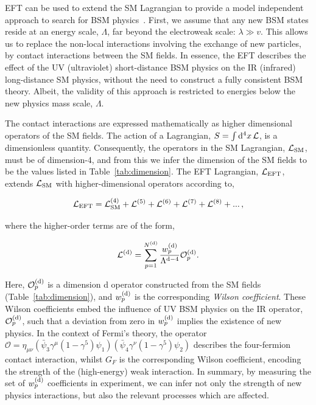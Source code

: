 EFT can be used to extend the SM Lagrangian to provide a model independent approach to search for BSM physics~\cite{Brivio:2017vri}. First, we assume that any new BSM states reside at an energy scale, $\Lambda$, far beyond the electroweak scale: $\lambda \gg v$. This allows us to replace the non-local interactions involving the exchange of new particles, by contact interactions between the SM fields. In essence, the EFT describes the effect of the UV (ultraviolet) short-distance BSM physics on the IR (infrared) long-distance SM physics, without the need to construct a fully consistent BSM theory. Albeit, the validity of this approach is restricted to energies below the new physics mass scale, $\Lambda$.

The contact interactions are expressed mathematically as higher dimensional operators of the SM fields. The action of a Lagrangian, $S=\int {\rm{d}}^4x\,\mathcal{L}$, is a dimensionless quantity. Consequently, the operators in the SM Lagrangian, $\mathcal{L}_{\rm{SM}}$, must be of dimension-4, and from this we infer the dimension of the SM fields to be the values listed in Table~\ref{tab:dimension}. The EFT Lagrangian, $\mathcal{L}_{\rm{EFT}}$, extends $\mathcal{L}_{\rm{SM}}$ with higher-dimensional operators according to,

\begin{equation}\label{eq:eft_expansion}
    \mathcal{L}_{\rm{EFT}} = \mathcal{L}^{\rm{(4)}}_{\rm{SM}} + \mathcal{L}^{\rm{(5)}} + \mathcal{L}^{\rm{(6)}} + \mathcal{L}^{\rm{(7)}} + \mathcal{L}^{\rm{(8)}} + {\rm{...}} \, ,
\end{equation}

\noindent
where the higher-order terms are of the form,

\begin{equation}\label{eq:eft_term}
    \mathcal{L}^{\rm{(d)}} = \sum^{N^{\rm{(d)}}}_{p=1} \frac{w^{\rm{(d)}}_p}{\Lambda^{{\rm{d}}-4}} \mathcal{O}^{\rm{(d)}}_p.
\end{equation}

\noindent
Here, $\mathcal{O}^{\rm{(d)}}_p$ is a dimension d operator constructed from the SM fields (Table~\ref{tab:dimension}), and $w^{\rm{(d)}}_p$ is the corresponding \textit{Wilson coefficient}. These Wilson coefficients embed the influence of UV BSM physics on the IR operator, $\mathcal{O}^{\rm{(d)}}_p$, such that a deviation from zero in $w^{\rm{(d)}}_p$ implies the existence of new physics. In the context of Fermi's theory, the operator $\mathcal{O}=\eta_{\mu\nu} (\bar{\psi}_3 \gamma^\mu(1-\gamma^5) \psi_1)(\bar{\psi}_4 \gamma^\nu(1-\gamma^5) \psi_2)$ describes the four-fermion contact interaction, whilst $G_F$ is the corresponding Wilson coefficient, encoding the strength of the (high-energy) weak interaction. In summary, by measuring the set of $w^{\rm{(d)}}_p$ coefficients in experiment, we can infer not only the strength of new physics interactions, but also the relevant processes which are affected.

